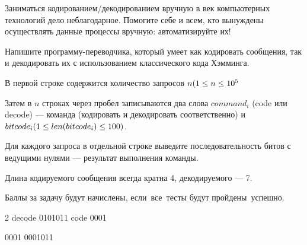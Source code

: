 
Заниматься кодированием/декодированием вручную в век компьютерных технологий дело неблагодарное. Помогите себе и всем, кто вынуждены осуществлять данные процессы вручную: автоматизируйте их!

Напишите программу-переводчика, который умеет как кодировать сообщения, так и декодировать их с использованием классического кода Хэмминга.


В первой строке содержится количество запросов $n\space (1\leq n \leq 10^5 $

Затем в $n$ строках через пробел записываются два слова $command_i$ (code или decode) — команда (кодировать и декодировать соответственно) и $ bitcode_i\space (1\leq len(bitcode_i) \leq 100)$.

\outputfmtSection

Для каждого запроса в отдельной строке выведите последовательность битов с ведущими нулями — результат выполнения команды.

\explanationSection

Длина кодируемого сообщения всегда кратна 4, декодируемого — 7.

\markSection

Баллы за задачу будут начислены, если все тесты будут пройдены успешно.


\begin{myverbbox}[\small]{\vinput}
    2
    decode 0101011
    code 0001
\end{myverbbox}
\begin{myverbbox}[\small]{\voutput}
    0001
    0001011
\end{myverbbox}

